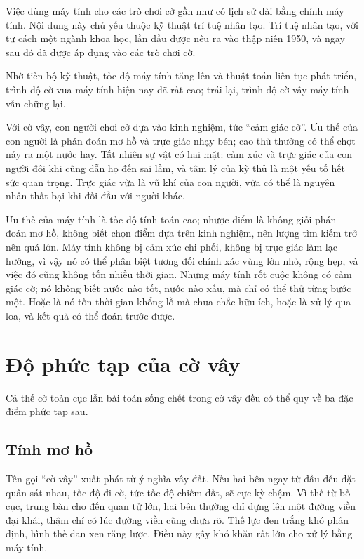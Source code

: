 \documentclass[11pt]{article}
\begin{document}
Việc dùng máy tính cho các trò chơi cờ gần như có lịch sử dài bằng chính máy
tính. Nội dung này chủ yếu thuộc kỹ thuật trí tuệ nhân tạo. Trí tuệ nhân tạo,
với tư cách một ngành khoa học, lần đầu được nêu ra vào thập niên 1950, và
ngay sau đó đã được áp dụng vào các trò chơi cờ.

Nhờ tiến bộ kỹ thuật, tốc độ máy tính tăng lên và thuật toán liên tục phát
triển, trình độ cờ vua máy tính hiện nay đã rất cao; trái lại, trình độ cờ
vây máy tính vẫn chững lại.

Với cờ vây, con người chơi cờ dựa vào kinh nghiệm, tức ``cảm giác cờ''. Ưu
thế của con người là phán đoán mơ hồ và trực giác nhạy bén; cao thủ thường có
thể chợt nảy ra một nước hay. Tất nhiên sự vật có hai mặt: cảm xúc và trực
giác của con người đôi khi cũng dẫn họ đến sai lầm, và tâm lý của kỳ thủ là
một yếu tố hết sức quan trọng. Trực giác vừa là vũ khí của con người, vừa có
thể là nguyên nhân thất bại khi đối đầu với người khác.

Ưu thế của máy tính là tốc độ tính toán cao; nhược điểm là không giỏi phán
đoán mơ hồ, không biết chọn điểm dựa trên kinh nghiệm, nên lượng tìm kiếm trở
nên quá lớn. Máy tính không bị cảm xúc chi phối, không bị trực giác làm lạc
hướng, vì vậy nó có thể phân biệt tương đối chính xác vùng lớn nhỏ, rộng hẹp,
và việc đó cũng không tốn nhiều thời gian. Nhưng máy tính rốt cuộc không có
cảm giác cờ; nó không biết nước nào tốt, nước nào xấu, mà chỉ có thể thử từng
bước một. Hoặc là nó tốn thời gian khổng lồ mà chưa chắc hữu ích, hoặc là xử
lý qua loa, và kết quả có thể đoán trước được.

\section{Độ phức tạp của cờ vây}

Cả thế cờ toàn cục lẫn bài toán sống chết trong cờ vây đều có thể quy về ba
đặc điểm phức tạp sau.

\subsection{Tính mơ hồ}

Tên gọi ``cờ vây'' xuất phát từ ý nghĩa vây đất. Nếu hai bên ngay từ đầu đều
đặt quân sát nhau, tốc độ đi cờ, tức tốc độ chiếm đất, sẽ cực kỳ chậm. Vì thế
từ bố cục, trung bàn cho đến quan tử lớn, hai bên thường chỉ dựng lên một
đường viền đại khái, thậm chí có lúc đường viền cũng chưa rõ. Thế lực đen
trắng khó phân định, hình thế đan xen răng lược. Điều này gây khó khăn rất
lớn cho xử lý bằng máy tính.
\end{document}
